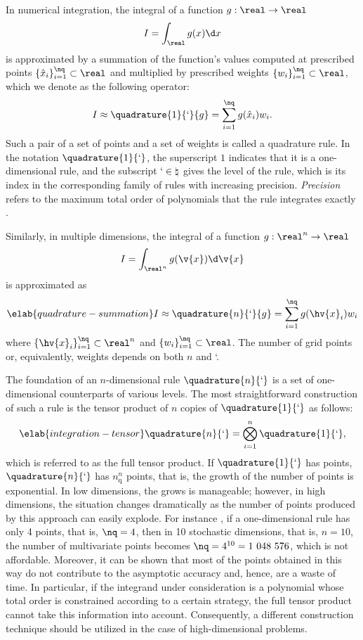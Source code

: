 In numerical integration, the integral of a function $g: \real \to \real$
\[
  I = \int_\real g(x) \d x
\]
is approximated by a summation of the function's values computed at prescribed
points $\{ \hat{x}_i \}_{i = 1}^\nq \subset \real$ and multiplied by prescribed
weights $\{ w_i \}_{i = 1}^\nq \subset \real$, which we denote as the following
operator:
\[
  I \approx \quadrature{1}{\lq}{g} = \sum_{i = 1}^\nq g(\hat{x}_i) w_i.
\]
Such a pair of a set of points and a set of weights is called a quadrature rule.
In the notation $\quadrature{1}{\lq}$, the superscript $1$ indicates that it is
a one-dimensional rule, and the subscript $\lq \in \natural$ gives the level of
the rule, which is its index in the corresponding family of rules with
increasing precision. \emph{Precision} refers to the maximum total order of
polynomials that the rule integrates exactly \cite{heiss2008}.

Similarly, in multiple dimensions, the integral of a function $g: \real^n \to
\real$
\[
  I = \int_{\real^n} g(\v{x}) \d \v{x}
\]
is approximated as
\begin{equation} \elab{quadrature-summation}
  I \approx \quadrature{n}{\lq}{g} = \sum_{i = 1}^\nq g(\hv{x}_i) w_i
\end{equation}
where $\{ \hv{x}_i \}_{i = 1}^\nq \subset \real^n$ and $\{ w_i \}_{i = 1}^\nq
\subset \real$. The number of grid points or, equivalently, weights \nq depends
on both $n$ and \lq.

The foundation of an $n$-dimensional rule $\quadrature{n}{\lq}$ is a set of
one-dimensional counterparts of various levels. The most straightforward
construction of such a rule is the tensor product of $n$ copies of
$\quadrature{1}{\lq}$ as follows:
\begin{equation} \elab{integration-tensor}
  \quadrature{n}{\lq} = \bigotimes_{i = 1}^n \quadrature{1}{\lq},
\end{equation}
which is referred to as the full tensor product. If $\quadrature{1}{\lq}$ has
\nq points, $\quadrature{n}{\lq}$ has $n_\mathrm{q}^n$ points, that is, the
growth of the number of points is exponential. In low dimensions, the grows is
manageable; however, in high dimensions, the situation changes dramatically as
the number of points produced by this approach can easily explode. For instance
\cite{heiss2008}, if a one-dimensional rule has only 4 points, that is, $\nq =
4$, then in 10 stochastic dimensions, that is, $n = 10$, the number of
multivariate points becomes $\nq = 4^{10} = 1~048~576$, which is not affordable.
Moreover, it can be shown that most of the points obtained in this way do not
contribute to the asymptotic accuracy and, hence, are a waste of time. In
particular, if the integrand under consideration is a polynomial whose total
order is constrained according to a certain strategy, the full tensor product
cannot take this information into account. Consequently, a different
construction technique should be utilized in the case of high-dimensional
problems.

